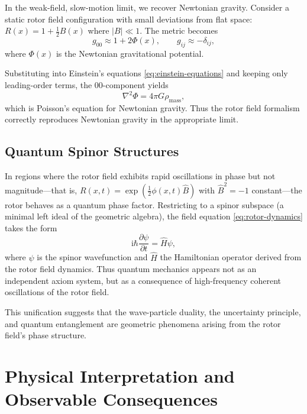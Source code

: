 \documentclass[11pt,a4paper]{article}
\numberwithin{equation}{section}
\theoremstyle{plain}
\theoremstyle{definition}
\theoremstyle{remark}
\newcommand{\ii}{\mathrm{i}}
\begin{document}
In the weak-field, slow-motion limit, we recover Newtonian gravity. Consider a static rotor field configuration with small deviations from flat space: $R(x) = 1 + \frac{1}{2}B(x)$ where $|B| \ll 1$. The metric becomes
\begin{equation}
g_{00} \approx 1 + 2\Phi(x), \qquad g_{ij} \approx -\delta_{ij},
\end{equation}
where $\Phi(x)$ is the Newtonian gravitational potential.

Substituting into Einstein's equations \eqref{eq:einstein-equations} and keeping only leading-order terms, the $00$-component yields
\begin{equation}
\nabla^2 \Phi = 4\pi G \rho_{\mathrm{mass}},
\label{eq:poisson}
\end{equation}
which is Poisson's equation for Newtonian gravity. Thus the rotor field formalism correctly reproduces Newtonian gravity in the appropriate limit.

\subsection{Quantum Spinor Structures}

In regions where the rotor field exhibits rapid oscillations in phase but not magnitude---that is, $R(x,t)=\exp(\frac{1}{2}\phi(x,t)\hat{B})$ with $\hat{B}^2=-1$ constant---the rotor behaves as a quantum phase factor. Restricting to a spinor subspace (a minimal left ideal of the geometric algebra), the field equation \eqref{eq:rotor-dynamics} takes the form
\begin{equation}
\ii \hbar \frac{\partial \psi}{\partial t} = \hat{H}\psi,
\end{equation}
where $\psi$ is the spinor wavefunction and $\hat{H}$ the Hamiltonian operator derived from the rotor field dynamics. Thus quantum mechanics appears not as an independent axiom system, but as a consequence of high-frequency coherent oscillations of the rotor field.

This unification suggests that the wave-particle duality, the uncertainty principle, and quantum entanglement are geometric phenomena arising from the rotor field's phase structure.

\section{Physical Interpretation and Observable Consequences}
\label{sec:physical}
\end{document}
